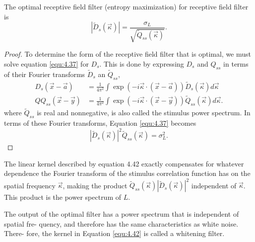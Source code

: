 \begin{thm}
  The optimal receptive field filter (entropy maximization) for receptive field filter is
  \begin{equation}
    \label{equ:4.42}
    \left| \tilde{D}_s(\vec{\kappa}) \right|=\frac{\sigma_L}{\sqrt{\tilde{Q}_{ss}(\vec{\kappa})}}.
  \end{equation}
  \begin{proof}
    To determine the form of the receptive field filter that is optimal, we must
    solve equation \ref{equ:4.37} for $D_s$. This is done by expressing $D_s$ and $Q_{ss}$ in terms of their Fourier transforms $\tilde{D}_s$ an  $\tilde{Q}_{ss}$,
    \begin{equation}
      \begin{aligned}
      \label{equ:4.394.40}
        D_s(\vec{x}-\vec{a})&=\frac{1}{4\pi^{2}}\int{\exp \left( -i\vec{\kappa} \cdot(\vec{x}-\vec{a}) \right)\tilde{D}_s(\vec{\kappa})d\vec{\kappa}}\\
         QQ_{ss}(\vec{x}-\vec{y})&=\frac{1}{4\pi^2}\int{\exp \left( -i\vec{\kappa} \cdot(\vec{x}-\vec{y}) \right)\tilde{Q}_{ss}(\vec{\kappa})d\vec{\kappa}}.   
              \end{aligned}
            \end{equation}
            where $\tilde{Q}_{ss}$ is real and nonnegative, is also called the stimulus power spectrum.
            In terms of these Fourier transforms, Equation \ref{equ:4.37} becomes
            \begin{equation}
              \label{equ:4.41}
            \left| \tilde{D}_s(\vec{\kappa}) \right|^2\tilde{Q}_{ss}(\vec{\kappa})=\sigma_L^2.
            \end{equation}
          \end{proof}
\end{thm}\qedhere
\begin{rem}
  The linear kernel described by equation 4.42 exactly compensates for
whatever dependence the Fourier transform of the stimulus correlation 
function has on the spatial frequency $\vec{\kappa}$, making the product $\tilde{Q}_{ss}(\vec{\kappa})\left| \tilde{D}_s(\vec{\kappa})  \right|^{2}$ independent of $\vec{\kappa}$. This product is the power spectrum of $L$. 
\end{rem}

\begin{defn}
  The output of the optimal filter has a power spectrum that is independent of spatial fre-
quency, and therefore has the same characteristics as white noise. There-
fore, the kernel in Equation \ref{equ:4.42} is called a whitening filter.
\end{defn}

